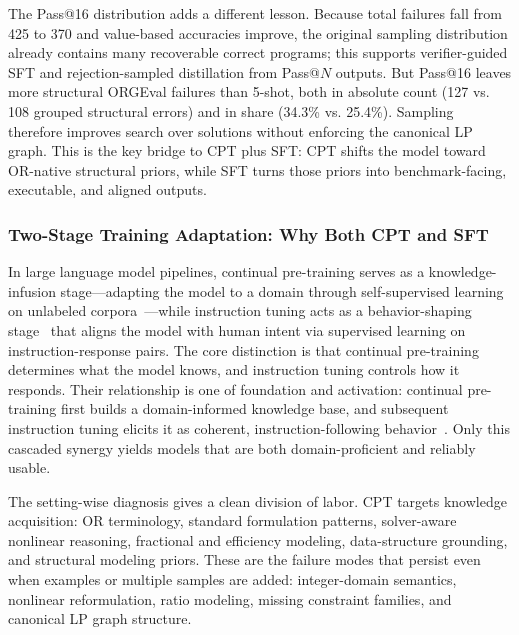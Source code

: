The Pass@16 distribution adds a different lesson. Because total failures fall
from 425 to 370 and value-based accuracies improve, the original sampling
distribution already contains many recoverable correct programs; this supports
verifier-guided SFT and rejection-sampled distillation from Pass@\(N\) outputs.
But Pass@16 leaves more structural ORGEval failures than 5-shot, both in
absolute count (127 vs. 108 grouped structural errors) and in share
(34.3\% vs. 25.4\%). Sampling therefore improves search over solutions without
enforcing the canonical LP graph. This is the key bridge to CPT plus SFT: CPT
shifts the model toward OR-native structural priors, while SFT turns those
priors into benchmark-facing, executable, and aligned outputs.

\subsubsection{Two-Stage Training Adaptation: Why Both CPT and SFT}

In large language model pipelines, continual pre-training serves as a knowledge-infusion stage---adapting the model to a domain through self-supervised learning on unlabeled corpora~\citep{gururangan2020dontstop, ke2025demystifying, siriwardhana2024domain}---while instruction tuning acts as a behavior-shaping stage~\citep{ouyang2022training, wei2022finetuned, sanh2021multitask} that aligns the model with human intent via supervised learning on instruction-response pairs. The core distinction is that continual pre-training determines what the model knows, and instruction tuning controls how it responds. Their relationship is one of foundation and activation: continual pre-training first builds a domain-informed knowledge base, and subsequent instruction tuning elicits it as coherent, instruction-following behavior~\citep{yang2025main, jindal2024balancing, jiang2025mix, zhang2025adept}. Only this cascaded synergy yields models that are both domain-proficient and reliably usable.

The setting-wise diagnosis gives a clean division of labor. CPT targets
knowledge acquisition: OR terminology, standard formulation patterns,
solver-aware nonlinear reasoning, fractional and efficiency modeling,
data-structure grounding, and structural modeling priors. These are the
failure modes that persist even when examples or multiple samples are added:
integer-domain semantics, nonlinear reformulation, ratio modeling, missing
constraint families, and canonical LP graph structure.

